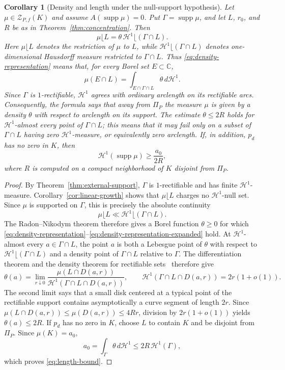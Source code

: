 \documentclass[reqno]{amsart}
\newtheorem{corollary}[theorem]{Corollary}
\theoremstyle{definition}
\theoremstyle{remark}
\newcommand{\bC}{\mathbb C}
\newcommand{\supp}{\operatorname{supp}}
\newcommand{\Hone}{\mathcal H^1}
\begin{document}
\begin{corollary}[Density and length under the null-support hypothesis]\label{cor:length}
Let $\mu\in\mathcal Z_{P,f}(K)$ and assume $A(\supp\mu)=0$.  Put
$\Gamma=\supp\mu$, and let $L$, $r_0$, and $R$ be as in
Theorem~\ref{thm:concentration}.  Then
\begin{equation}\label{eq:density-representation}
 \mu\lfloor L=\theta\,\Hone\lfloor(\Gamma\cap L).
\end{equation}
Here $\mu\lfloor L$ denotes the restriction of $\mu$ to $L$, while
$\Hone\lfloor(\Gamma\cap L)$ denotes one-dimensional Hausdorff measure
restricted to $\Gamma\cap L$.  Thus \eqref{eq:density-representation} means
that, for every Borel set $E\subset\bC$,
\begin{equation}\label{eq:density-representation-expanded}
 \mu(E\cap L)=\int_{E\cap\Gamma\cap L}\theta\,d\Hone.
\end{equation}
Since $\Gamma$ is $1$-rectifiable, $\Hone$ agrees with ordinary arclength on
its rectifiable arcs.  Consequently, the formula says that away from
$\Pi_P$ the measure $\mu$ is given by a density $\theta$ with respect to
arclength on its support.  The estimate $\theta\le2R$ holds for
$\Hone$-almost every point of $\Gamma\cap L$; this means that it may fail only
on a subset of $\Gamma\cap L$ having zero $\Hone$-measure, or equivalently
zero arclength.  If, in addition, $p_d$ has no
zero in $K$, then
\begin{equation}\label{eq:length-bound}
 \Hone(\supp\mu)\ge\frac{a_0}{2R},
\end{equation}
where $R$ is computed on a compact neighborhood of $K$ disjoint from
$\Pi_P$.
\end{corollary}

\begin{proof}
By Theorem~\ref{thm:external-support}, $\Gamma$ is $1$-rectifiable and has
finite $\Hone$-measure.  Corollary~\ref{cor:linear-growth} shows that
$\mu\lfloor L$ charges no $\Hone$-null set.  Since $\mu$ is supported on
$\Gamma$, this is precisely the absolute continuity
\[
 \mu\lfloor L\ll\Hone\lfloor(\Gamma\cap L).
\]
The Radon--Nikodym theorem therefore gives a Borel function $\theta\ge0$ for
which \eqref{eq:density-representation}--\eqref{eq:density-representation-expanded}
hold.  At $\Hone$-almost every $a\in\Gamma\cap L$, the point $a$ is both a
Lebesgue point of $\theta$ with respect to
$\Hone\lfloor(\Gamma\cap L)$ and a density point of $\Gamma\cap L$ relative
to $\Gamma$.  The differentiation theorem and the density theorem for
rectifiable sets~\cite[Ch.~16]{Mattila} therefore give
\[
 \theta(a)
 =\lim_{r\downarrow0}
   \frac{\mu(L\cap D(a,r))}
        {\Hone(\Gamma\cap L\cap D(a,r))},
 \qquad
 \Hone(\Gamma\cap L\cap D(a,r))=2r(1+o(1)).
\]
The second limit says that a small disk centered at a typical point of the
rectifiable support contains asymptotically a curve segment of length $2r$.
Since $\mu(L\cap D(a,r))\le\mu(D(a,r))\le4Rr$, division by
$2r(1+o(1))$ yields $\theta(a)\le2R$.  If
$p_d$ has no zero in $K$, choose $L$ to contain $K$ and be disjoint from
$\Pi_P$.  Since $\mu(K)=a_0$,
\[
 a_0=\int_\Gamma\theta\,d\Hone
 \le2R\,\Hone(\Gamma),
\]
which proves \eqref{eq:length-bound}.
\end{proof}
\end{document}
